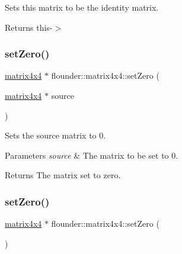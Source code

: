 Sets this matrix to be the identity matrix. 

\begin{DoxyReturn}{Returns}
this-\/$>$ 
\end{DoxyReturn}
\mbox{\label{classflounder_1_1matrix4x4_ab9f73c85d8b8844435858aafbf99d5d7}} 
\subsubsection{\texorpdfstring{set\+Zero()}{setZero()}\hspace{0.1cm}{\footnotesize\ttfamily [1/2]}}
{\footnotesize\ttfamily \hyperlink{classflounder_1_1matrix4x4}{matrix4x4} $\ast$ flounder\+::matrix4x4\+::set\+Zero (\begin{DoxyParamCaption}\item[{\hyperlink{classflounder_1_1matrix4x4}{matrix4x4} $\ast$}]{source }\end{DoxyParamCaption})\hspace{0.3cm}{\ttfamily [static]}}



Sets the source matrix to 0. 


\begin{DoxyParams}{Parameters}
{\em source} & The matrix to be set to 0. \\
\hline
\end{DoxyParams}
\begin{DoxyReturn}{Returns}
The matrix set to zero. 
\end{DoxyReturn}
\mbox{\label{classflounder_1_1matrix4x4_a3fd10ae3589d6ec447cc50f032cfc2f7}} 
\subsubsection{\texorpdfstring{set\+Zero()}{setZero()}\hspace{0.1cm}{\footnotesize\ttfamily [2/2]}}
{\footnotesize\ttfamily \hyperlink{classflounder_1_1matrix4x4}{matrix4x4} $\ast$ flounder\+::matrix4x4\+::set\+Zero (\begin{DoxyParamCaption}{ }\end{DoxyParamCaption})}



